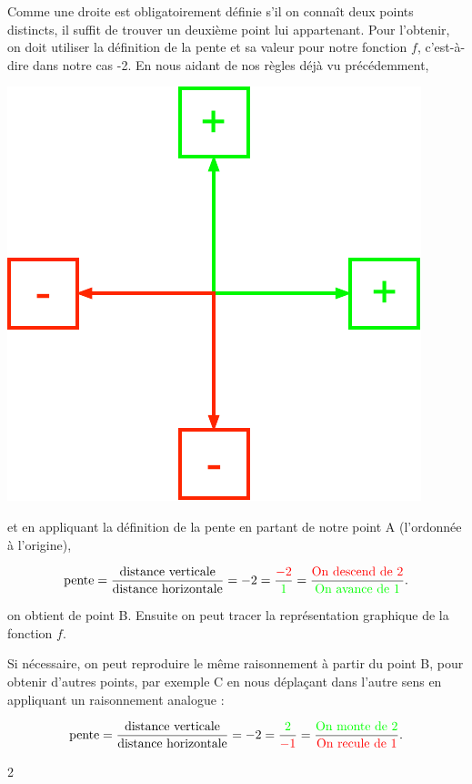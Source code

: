 \documentclass[a4paper,11pt]{report}
\begin{document}
{Comme une droite est obligatoirement définie s'il on connaît deux points distincts, il suffit de trouver un deuxième point lui appartenant. Pour l'obtenir, on doit utiliser la définition de la pente  et sa valeur pour notre fonction $f$, c'est-à-dire dans notre cas -2.
En nous aidant de nos règles déjà vu précédemment, 
\begin{center}
\includegraphics[scale=.75]{media/FA-30/fleches.pdf}
\end{center}

et en appliquant la définition de la pente en partant de notre point A (l'ordonnée à l'origine),

$$\mbox{pente} = \dfrac{\mbox{distance verticale}}{\mbox{distance horizontale}} = -2 =  \dfrac{\color{red}-2}{\color{green}1}=\dfrac{\mbox{\color{red}On descend de 2}}{\mbox{\color{green}On avance de 1}} . $$

on obtient de point B. Ensuite on peut tracer la représentation graphique de la fonction $f.$

Si nécessaire, on peut reproduire le même raisonnement à partir du point B, pour obtenir d'autres points, par exemple C en nous déplaçant dans l'autre sens en appliquant un raisonnement analogue :


$$\mbox{pente} = \dfrac{\mbox{distance verticale}}{\mbox{distance horizontale}} = -2 =  \dfrac{\color{green}2}{\color{red}-1}=\dfrac{\mbox{\color{green}On monte de 2}}{\mbox{\color{red}On recule de 1}} . $$
 }{2}
\end{document}
